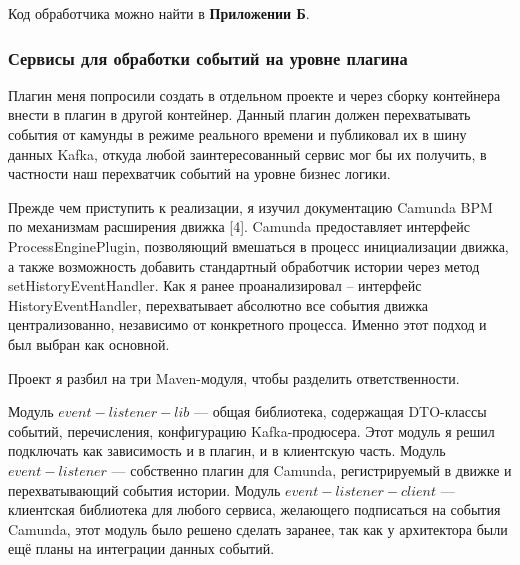 Код обработчика можно найти в \textbf{Приложении Б}.

\subsubsection{Сервисы для обработки событий на уровне плагина}

Плагин меня попросили создать в отдельном проекте и через сборку контейнера внести в плагин в другой контейнер. Данный плагин должен
перехватывать события от камунды в режиме реального времени и публиковал их в шину
данных Kafka, откуда любой заинтересованный сервис мог бы их получить, в частности наш перехватчик событий на уровне бизнес логики.

Прежде чем приступить к реализации, я изучил документацию Camunda BPM по       
механизмам расширения движка [4]. Camunda предоставляет интерфейс
ProcessEnginePlugin, позволяющий вмешаться в процесс инициализации движка, а   
также возможность добавить стандартный обработчик истории через метод
setHistoryEventHandler. Как я ранее проанализировал -- интерфейс HistoryEventHandler, перехватывает абсолютно
все события движка централизованно, независимо от конкретного процесса. Именно
этот подход и был выбран как основной. 

Проект я разбил на три Maven-модуля, чтобы разделить ответственности.
                                                                                 
Модуль $event-listener-lib$ — общая библиотека, содержащая DTO-классы событий,   
перечисления, конфигурацию Kafka-продюсера. Этот модуль я решил подключать как зависимость и в плагин, и в клиентскую часть.             
Модуль $event-listener$ — собственно плагин для Camunda, регистрируемый в движке 
и перехватывающий события истории. Модуль $event-listener-client$ — клиентская библиотека для любого сервиса,       
желающего подписаться на события Camunda, этот модуль было решено сделать заранее, так как у архитектора были ещё планы на интеграции данных событий.                        
  
